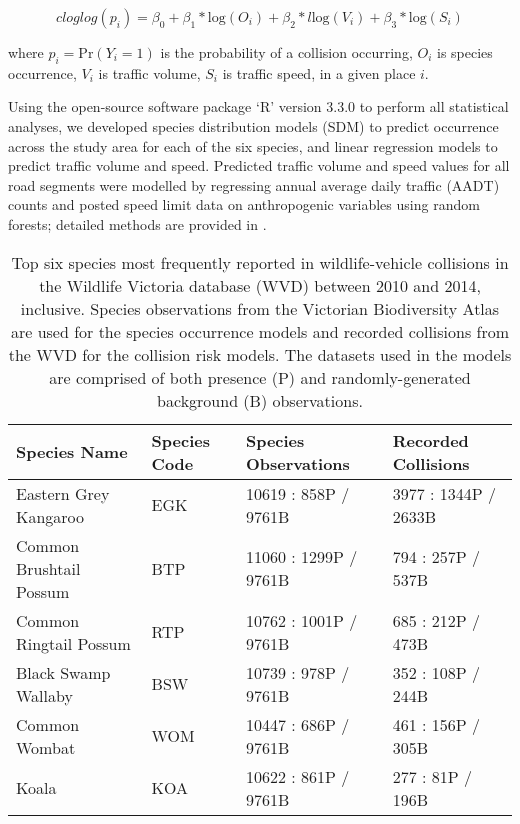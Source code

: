 \begin{equation} \label{eq:31}
cloglog(p_i) = \beta_0 + \beta_1*\text{log}(O_i) + \beta_2*l\text{log}(V_i) + \beta_3*\text{log}(S_i)
\end{equation}

\noindent where $p_i=\text{Pr}(Y_i=1)$ is the probability of a collision occurring, $O_i$ is species occurrence, $V_i$ is traffic volume, $S_i$ is traffic speed, in a given place $i$.

Using the open-source software package `R' version 3.3.0 \citep{rdct16} to perform all statistical analyses, we developed species distribution models (SDM) to predict occurrence across the study area for each of the six species, and linear regression models to predict traffic volume and speed. Predicted traffic volume and speed values for all road segments were modelled by regressing annual average daily traffic (AADT) counts and posted speed limit data on anthropogenic variables using random forests; detailed methods are provided in . 

\begin{table}[htp]
\caption{Top six species most frequently reported in wildlife-vehicle collisions in the Wildlife Victoria database (WVD) between 2010 and 2014, inclusive. Species observations from the Victorian Biodiversity Atlas are used for the species occurrence models and recorded collisions from the WVD for the collision risk models. The datasets used in the models are comprised of both presence (P) and randomly-generated background (B) observations.}
\begin{tabularx}{\textwidth}{llll} \toprule
Species Name                     &Species Code     &Species Observations     &Recorded Collisions \\ \midrule 
Eastern Grey Kangaroo 	& EGK	& 10619 : 858P / 9761B 	& 3977 : 1344P / 2633B \\ 
Common Brushtail Possum & BTP	& 11060 : 1299P / 9761B	& 794 : 257P / 537B \\ 
Common Ringtail Possum 	& RTP	& 10762 : 1001P / 9761B	& 685 : 212P / 473B \\ 
Black Swamp Wallaby 	& BSW	& 10739 : 978P / 9761B 	& 352 : 108P / 244B \\ 
Common Wombat 			& WOM	& 10447 : 686P / 9761B 	& 461 : 156P / 305B \\ 
Koala 					& KOA 	& 10622 : 861P / 9761B 	& 277 : 81P / 196B \\ 
\bottomrule
\end{tabularx}
\label{6sp_species_data}
\end{table}

